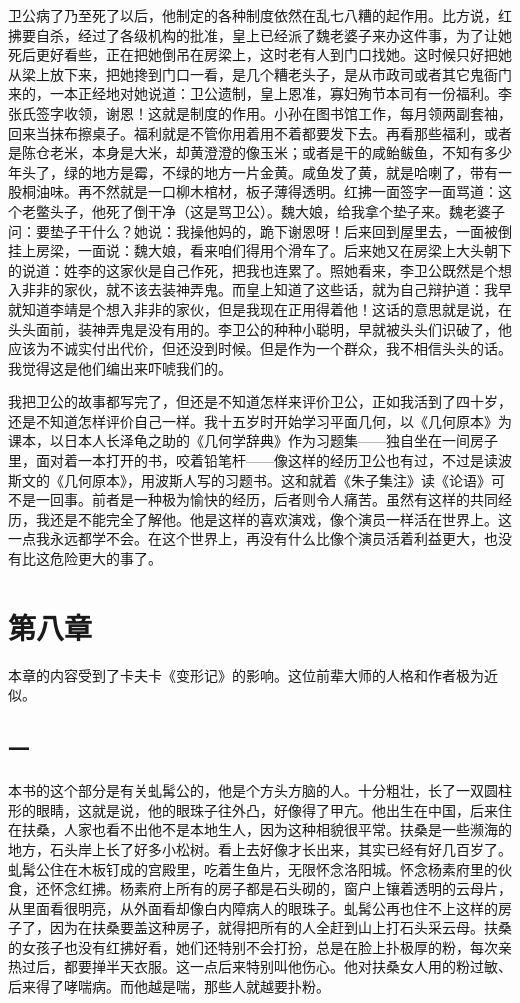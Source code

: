 卫公病了乃至死了以后，他制定的各种制度依然在乱七八糟的起作用。比方说，红拂要自杀，经过了各级机构的批准，皇上已经派了魏老婆子来办这件事，为了让她死后更好看些，正在把她倒吊在房梁上，这时老有人到门口找她。这时候只好把她从梁上放下来，把她搀到门口一看，是几个糟老头子，是从市政司或者其它鬼衙门来的，一本正经地对她说道：卫公遗制，皇上恩准，寡妇殉节本司有一份福利。李张氏签字收领，谢恩！这就是制度的作用。小孙在图书馆工作，每月领两副套袖，回来当抹布擦桌子。福利就是不管你用着用不着都要发下去。再看那些福利，或者是陈仓老米，本身是大米，却黄澄澄的像玉米；或者是干的咸鲐鲅鱼，不知有多少年头了，绿的地方是霉，不绿的地方一片金黄。咸鱼发了黄，就是哈喇了，带有一股桐油味。再不然就是一口柳木棺材，板子薄得透明。红拂一面签字一面骂道：这个老鳖头子，他死了倒干净（这是骂卫公）。魏大娘，给我拿个垫子来。魏老婆子问：要垫子干什么？她说：我操他妈的，跪下谢恩呀！后来回到屋里去，一面被倒挂上房梁，一面说：魏大娘，看来咱们得用个滑车了。后来她又在房梁上大头朝下的说道：姓李的这家伙是自己作死，把我也连累了。照她看来，李卫公既然是个想入非非的家伙，就不该去装神弄鬼。而皇上知道了这些话，就为自己辩护道：我早就知道李靖是个想入非非的家伙，但是我现在正用得着他！这话的意思就是说，在头头面前，装神弄鬼是没有用的。李卫公的种种小聪明，早就被头头们识破了，他应该为不诚实付出代价，但还没到时候。但是作为一个群众，我不相信头头的话。我觉得这是他们编出来吓唬我们的。 

我把卫公的故事都写完了，但还是不知道怎样来评价卫公，正如我活到了四十岁，还是不知道怎样评价自己一样。我十五岁时开始学习平面几何，以《几何原本》为课本，以日本人长泽龟之助的《几何学辞典》作为习题集——独自坐在一间房子里，面对着一本打开的书，咬着铅笔杆——像这样的经历卫公也有过，不过是读波斯文的《几何原本》，用波斯人写的习题书。这和就着《朱子集注》读《论语》可不是一回事。前者是一种极为愉快的经历，后者则令人痛苦。虽然有这样的共同经历，我还是不能完全了解他。他是这样的喜欢演戏，像个演员一样活在世界上。这一点我永远都学不会。在这个世界上，再没有什么比像个演员活着利益更大，也没有比这危险更大的事了。

\section{第八章}

本章的内容受到了卡夫卡《变形记》的影响。这位前辈大师的人格和作者极为近似。 

\subsection{一} 

本书的这个部分是有关虬髯公的，他是个方头方脑的人。十分粗壮，长了一双圆柱形的眼睛，这就是说，他的眼珠子往外凸，好像得了甲亢。他出生在中国，后来住在扶桑，人家也看不出他不是本地生人，因为这种相貌很平常。扶桑是一些濒海的地方，石头岸上长了好多小松树。看上去好像才长出来，其实已经有好几百岁了。虬髯公住在木板钉成的宫殿里，吃着生鱼片，无限怀念洛阳城。怀念杨素府里的伙食，还怀念红拂。杨素府上所有的房子都是石头砌的，窗户上镶着透明的云母片，从里面看很明亮，从外面看却像白内障病人的眼珠子。虬髯公再也住不上这样的房子了，因为在扶桑要盖这种房子，就得把所有的人全赶到山上打石头采云母。扶桑的女孩子也没有红拂好看，她们还特别不会打扮，总是在脸上扑极厚的粉，每次亲热过后，都要掸半天衣服。这一点后来特别叫他伤心。他对扶桑女人用的粉过敏、后来得了哮喘病。而他越是喘，那些人就越要扑粉。 

